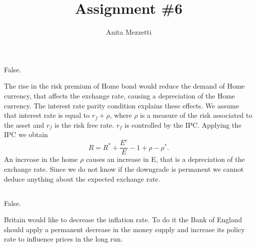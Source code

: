 \documentclass[	11pt, ]{fphw}
\title{Assignment \#6} %
\author{Anita Mezzetti}
\institute{École polytechnique fédérale de Lausanne}
\begin{document}
\maketitle

\section{}
\subsection{}
False. 
\par The rise in the risk premium of Home bond would reduce the
demand of Home currency, that affects the exchange rate, causing a
depreciation of the Home currency. 
The interest rate parity condition explains these effects. We assume that interest rate is equal to $r_{f }+ \rho $, where $\rho$ is a measure of the risk associated to the asset and $r_{f }$ is the risk free rate. $r_{f }$ is controlled by the IPC. Applying the IPC we obtain
\[R = R^{*} + \frac{E^{e}}{E} - 1 + \rho-\rho^{*}.\]
An increase in the home $\rho$ causes an increase in E, that is a depreciation
of the exchange rate. Since we do not know if the downgrade
is permanent we cannot deduce anything about the expected exchange rate.

\subsection{}
False. 
\par Britain would like to decrease the inflation rate. To do it the Bank of England should apply a permanent decrease in the money supply and increase its policy rate to influence prices in the long run.





\section{}
\subsection{}
\end{document}
